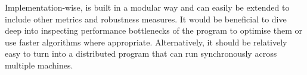 Implementation-wise, \graffs is built in a modular way and can easily be extended to include other metrics and robustness measures.
It would be beneficial to dive deep into inspecting performance bottlenecks of the program to optimise them or use faster algorithms where appropriate.
Alternatively, it should be relatively easy to turn \graffs into a distributed program that can run synchronously across multiple machines.
